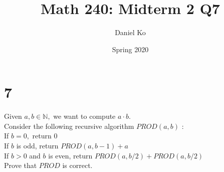\documentclass[11pt]{scrartcl}
\title{Math 240: Midterm 2 Q7}
\author{Daniel Ko}
\date{Spring 2020}
\begin{document}
\maketitle




\section{7}
Given $a, b \in \mathbb{N},$ we want to compute $a \cdot b$.\\
Consider the following recursive algorithm $PROD(a, b)$ :\\
\hspace*{10mm}If $b=0,$ return 0\\
\hspace*{10mm}If $b$ is odd, return $PROD(a, b-1)+a$\\
\hspace*{10mm}If $b>0$ and $b$ is even, return $PROD(a, b / 2) + PROD(a, b / 2)$\\
Prove that $PROD$ is correct.
\end{document}

